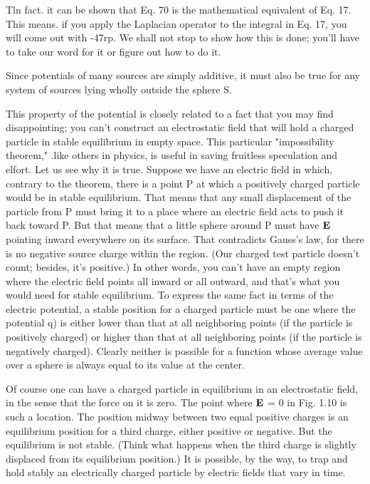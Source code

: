 Tln fact. it can be shown that Eq. 70 is the mathematical equivalent of Eq. 17. This
means. if you apply the Laplacian operator to the integral in Eq. 17, you will come
out with -47rp. We shall not stop to show how this is done; you'll have to take our
word for it or figure out how to do it.

Since potentials of many sources are simply additive, it must also be
true for any system of sources lying wholly outside the sphere S.

This property of the potential is closely related to a fact that you
may find disappointing; you can't construct an electrostatic field that
will hold a charged particle in stable equilibrium in empty space.
This particular "impossibility theorem," .like others in physics, is
useful in saving fruitless speculation and elfort. Let us see why it
is true. Suppose we have an electric field in which, contrary to the
theorem, there is a point P at which a positively charged particle
would be in stable equilibrium. That means that any small displacement
of the particle from P must bring it to a place where an electric
field acts to push it back toward P. But that means that a little sphere
around P must have $\mathbf{E}$ pointing inward everywhere on its surface.
That contradicts Gauss's law, for there is no negative source charge
within the region. (Our charged test particle doesn't count; besides,
it's positive.) In other words, you can't have an empty region where
the electric field points all inward or all outward, and that's what you
would need for stable equilibrium. To express the same fact in terms
of the electric potential, a stable position for a charged particle must
be one where the potential q) is either lower than that at all neighboring
points (if the particle is positively charged) or higher than that
at all neighboring points (if the particle is negatively charged).
Clearly neither is possible for a function whose average value over a
sphere is always equal to its value at the center.

Of course one can have a charged particle in equilibrium in an electrostatic
field, in the sense that the force on it is zero. The point
where $\mathbf{E}$ = 0 in Fig. 1.10 is such a location. The position midway
between two equal positive charges is an equilibrium position for a
third charge, either positive or negative. But the equilibrium is not
stable. (Think what happens when the third charge is slightly displaced
from its equilibrium position.) It is possible, by the way,
to trap and hold stably an electrically charged particle by electric
fields that vary in time.

